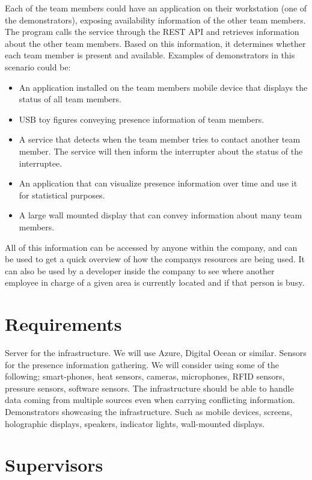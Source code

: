 \documentclass{sigchi}
\begin{document}
Each of the team members could have an application on their workstation (one of the demonstrators), exposing availability information of the other team members. The program calls the service through the REST API and retrieves information about the other team members. Based on this information, it determines whether each team member is present and available. Examples of demonstrators in this scenario could be:

\begin{itemize}
\item An application installed on the team members mobile device that displays the status of all team members.
\item USB toy figures conveying presence information of team members.
\item A service that detects when the team member tries to contact another team member. The service will then inform the interrupter about the status of the interruptee.
\item An application that can visualize presence information over time and use it for statistical purposes.
\item A large wall mounted display that can convey information about many team members.
\end{itemize}

All of this information can be accessed by anyone within the company, and can be used to get a quick overview of how the companys resources are being used. It can also be used by a developer inside the company to see where another employee in charge of a given area is currently located and if that person is busy.

\section{Requirements}

Server for the infrastructure. We will use Azure, Digital Ocean or similar.
Sensors for the presence information gathering. We will consider using some of the following; smart-phones, heat sensors, cameras, microphones, RFID sensors, pressure sensors, software sensors.
The infrastructure should be able to handle data coming from multiple sources even when carrying conflicting information.
Demonstrators showcasing the infrastructure. Such as mobile devices, screens, holographic displays, speakers, indicator lights, wall-mounted displays.

\section{Supervisors}
\end{document}
